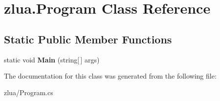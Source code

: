 \hypertarget{classzlua_1_1_program}{}\section{zlua.\+Program Class Reference}
\label{classzlua_1_1_program}
\subsection*{Static Public Member Functions}
\begin{DoxyCompactItemize}
\item 
\mbox{\label{classzlua_1_1_program_a432b86f3ddeb20105ae96a48414194ff}} 
static void {\bfseries Main} (string\mbox{[}$\,$\mbox{]} args)
\end{DoxyCompactItemize}


The documentation for this class was generated from the following file\+:\begin{DoxyCompactItemize}
\item 
zlua/Program.\+cs\end{DoxyCompactItemize}
